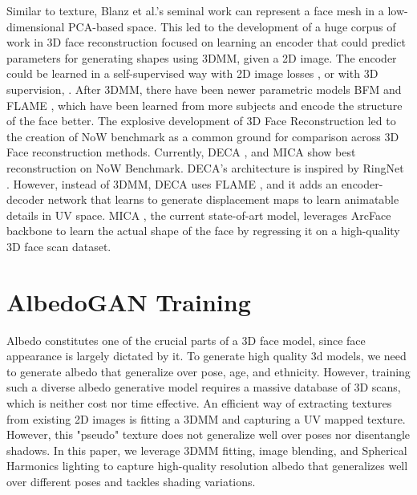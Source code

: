 \documentclass[10pt,twocolumn,letterpaper]{article}
\begin{document}
 Similar to texture, Blanz et al.'s seminal work \cite{3dmm} can represent a face mesh in a low-dimensional PCA-based space. This led to the development of a huge corpus of work \cite{deep3dface_recon, tewari, ringnet, occlusion_robust_mofa} in 3D face reconstruction focused on learning an encoder that could predict parameters for generating shapes using 3DMM, given a 2D image. The encoder could be learned in a self-supervised way with 2D image losses \cite{deca, occlusion_robust_mofa, deep3dface_recon, tewari, ringnet}, or with 3D supervision, \cite{MICA:ECCV2022}. After 3DMM\cite{3dmm}, there have been newer parametric models BFM \cite{bfm} and FLAME \cite{flame}, which have been learned from more subjects and encode the structure of the face better. The explosive development of 3D Face Reconstruction led to the creation of NoW benchmark \cite{ringnet} as a common ground for comparison across 3D Face reconstruction methods. Currently, DECA \cite{deca}, and MICA \cite{MICA:ECCV2022} show best reconstruction on NoW Benchmark. DECA's architecture is inspired by RingNet \cite{ringnet}. However, instead of 3DMM, DECA uses FLAME \cite{flame}, and it adds an encoder-decoder network that learns to generate displacement maps to learn animatable details in UV space. MICA \cite{MICA:ECCV2022}, the current state-of-art model, leverages ArcFace backbone \cite{deng2018arcface} to learn the actual shape of the face by regressing it on a high-quality 3D face scan dataset\cite{LYHM, stirling, facewarehouse}.


































\section{AlbedoGAN Training}




Albedo constitutes one of the crucial parts of a 3D face model, since face appearance is largely dictated by it. To generate high quality 3d models, we need to generate albedo that generalize over pose, age, and ethnicity. However, training such a diverse albedo generative model requires a massive database of 3D scans, which is neither cost nor time effective. An efficient way of extracting textures from existing 2D images is fitting a 3DMM and capturing a UV mapped texture. However, this "pseudo" texture does not generalize well over poses nor disentangle shadows. In this paper, we leverage 3DMM fitting, image blending, and Spherical Harmonics lighting to capture high-quality  resolution albedo that generalizes well over different poses and tackles shading variations.
\end{document}
